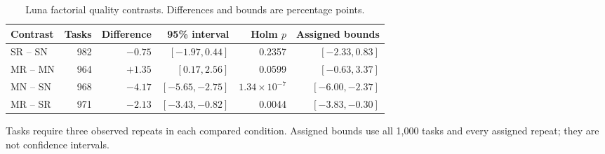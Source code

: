 \begin{table}[htbp]\centering\small
\caption{Luna factorial quality contrasts. Differences and bounds are percentage points.}
\label{tab:scale-contrasts}
\begin{tabular}{lrrrrr}\toprule
Contrast & Tasks & Difference & 95\% interval & Holm $p$ & Assigned bounds\\\midrule
SR -- SN & 982 & $-0.75$ & $[-1.97, 0.44]$ & 0.2357 & $[-2.33, 0.83]$\\
MR -- MN & 964 & $+1.35$ & $[0.17, 2.56]$ & 0.0599 & $[-0.63, 3.37]$\\
MN -- SN & 968 & $-4.17$ & $[-5.65, -2.75]$ & $1.34\times10^{-7}$ & $[-6.00, -2.37]$\\
MR -- SR & 971 & $-2.13$ & $[-3.43, -0.82]$ & 0.0044 & $[-3.83, -0.30]$\\
\bottomrule\end{tabular}
\par\smallskip\noindent Tasks require three observed repeats in each compared condition. Assigned bounds use all 1,000 tasks and every assigned repeat; they are not confidence intervals.
\end{table}
